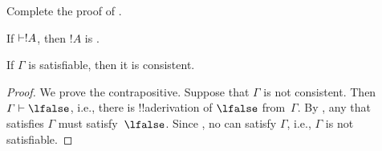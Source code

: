\documentclass[../../../include/open-logic-section]{subfiles}
\begin{document}
\begin{prob}
  Complete the proof of .
\end{prob}
\tagendprob

\begin{cor}
If $\Proves !A$, then $!A$ is .
\end{cor}

\begin{cor}
If $\Gamma$ is satisfiable, then it is consistent.
\end{cor}

\begin{proof}
We prove the contrapositive.  Suppose that $\Gamma$ is not consistent.
Then $\Gamma \Proves \lfalse$, i.e., there is !!a{derivation} of
$\lfalse$ from~$\Gamma$. By , any
that satisfies $\Gamma$ must satisfy~$\lfalse$.  Since
, no
 can satisfy $\Gamma$, i.e.,
$\Gamma$ is not satisfiable.
\end{proof}
\end{document}
